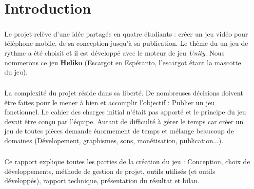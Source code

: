 \chapter{Introduction}

\paragraph{}
Le projet relève d'une idée partagée en quatre étudiants : créer un jeu vidéo pour téléphone mobile, de sa conception jusqu'à sa publication. Le thème du un jeu de rythme a été choisit et il est développé avec le moteur de jeu \textit{Unity}. Nous nommerons ce jeu \textbf{Heliko} (Escargot en Espéranto, l'escargot étant la mascotte du jeu).

\paragraph{}
La complexité du projet réside dans sa liberté. De nombreuses décisions doivent être faites pour le mener à bien et accomplir l'objectif : Publier un jeu fonctionnel. Le cahier des charges initial n'était pas apporté et le principe du jeu devait être conçu par l'équipe. Autant de difficulté à gérer le temps car créer un jeu de toutes pièces demande énormement de temps et mélange beaucoup de domaines (Dévelopement, graphismes, sons, monétisation, publication...).

\paragraph{}
Ce rapport explique toutes les parties de la création du jeu : Conception, choix de développements, méthode de gestion de projet, outils utilisés (et outils développés), rapport technique, présentation du résultat et bilan.
